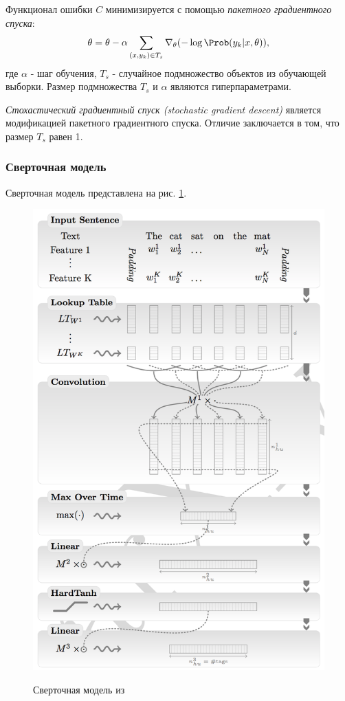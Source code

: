   Функционал ошибки $C$ минимизируется с помощью \textit{пакетного градиентного спуска}:
  \[
    \theta = \theta - \alpha\sum_{(x, y_k) \in T_s}\nabla_{\theta}(-\log\Prob(y_k | x, \theta)),
  \]
  где $\alpha$ - шаг обучения, $T_s$ - случайное подмножество объектов из обучающей выборки.
  Размер подмножества $T_s$ и $\alpha$ являются гиперпараметрами.

  \textit{Стохастический градиентный спуск (stochastic gradient descent)} является
  модификацией пакетного градиентного спуска. Отличие заключается в том, что размер $T_s$ равен 1.

  \subsubsection{Сверточная модель}  \label{subsubsection:conv}
  Сверточная модель представлена на рис. \ref{figure:conv_net}.
  \newpage
  \begin{figure}[!h]
    \centering
    \caption{Сверточная модель из \citep{collobert2011natural}}
    \includegraphics[scale=0.9]{figures/sentence-diagram.png}
    \label{figure:conv_net}
  \end{figure}

